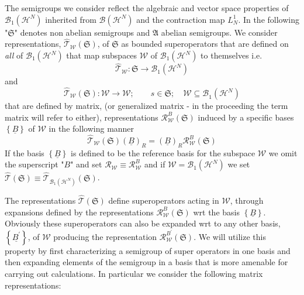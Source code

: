 \documentclass[aps,preprint]{revtex4}%
\begin{document}
The semigroups we consider reflect the algebraic and vector space properties
of $\mathcal{B}_{1}\left(  \mathcal{H}^{N}\right)  $ inherited from
$\mathcal{B}\left(  \mathcal{H}^{N}\right)  $ and the contraction map
$L_{N}^{1}$. In the following "$\mathfrak{S}$" denotes non abelian semigroups
and $\mathfrak{A}$ abelian semigroups. We consider representations,
$\mathcal{\hat{T}}_{\mathcal{W}}\left(  \mathfrak{S}\right)  $, of
$\mathfrak{S}$ as bounded superoperators that are defined on \emph{all }of
$\mathcal{B}_{1}\left(  \mathcal{H}^{N}\right)  $ that map subspaces
$\mathcal{W}$ of $\mathcal{B}_{1}\left(  \mathcal{H}^{N}\right)  $ to
themselves i.e.
\begin{equation}
\mathcal{\hat{T}}_{\mathcal{W}}:\mathfrak{S}\rightarrow\mathcal{B}_{1}\left(
\mathcal{H}^{N}\right)
\end{equation}
and
\begin{equation}
\mathcal{\hat{T}}_{\mathcal{W}}\left(  \mathfrak{S}\right)  :\mathcal{W}%
\rightarrow\mathcal{W};\qquad s\in\mathfrak{S};\quad\mathcal{W\subseteq B}%
_{1}\left(  \mathcal{H}^{N}\right)
\end{equation}
that are defined by matrix, (or generalized matrix - in the proceeding the
term matrix will refer to either), representations $\mathcal{R}_{\mathcal{W}%
}^{B}\left(  \mathfrak{S}\right)  $ induced by a specific bases $\left\{
\underline{B}\right\}  $ of $\mathcal{W}$ in the following manner
\begin{equation}
\mathcal{\hat{T}}_{\mathcal{W}}\left(  \mathfrak{S}\right)  \left(
\underline{B}\right)  _{R}=\left(  \underline{B}\right)  _{R}\mathcal{R}%
_{\mathcal{W}}^{B}\left(  \mathfrak{S}\right)
\end{equation}
If the basis $\left\{  \underline{B}\right\}  $ is defined to be the reference
basis for the subspace $\mathcal{W}$ we omit the superscript "$B$" and set
$\mathcal{R}_{\mathcal{W}}\equiv\mathcal{R}_{\mathcal{W}}^{B}$ and if
$\mathcal{W}=\mathcal{B}_{1}\left(  \mathcal{H}^{N}\right)  $ we set
$\mathcal{\hat{T}}\left(  \mathfrak{S}\right)  \equiv\mathcal{\hat{T}%
}_{\mathcal{B}_{1}\left(  \mathcal{H}^{N}\right)  }\left(  \mathfrak{S}%
\right)  $.

The representations $\mathcal{\hat{T}}\left(  \mathfrak{S}\right)  $ define
superoperators acting in $\mathcal{W}$, through expansions defined by the
representations $\mathcal{R}_{\mathcal{W}}^{B}\left(  \mathfrak{S}\right)  $
wrt the basis $\left\{  \underline{B}\right\}  $. Obviously these
superoperators can also be expanded wrt to any other basis, $\left\{
\underline{B^{\prime}}\right\}  $, of $\mathcal{W}$ producing the
representation $\mathcal{R}_{\mathcal{W}}^{B^{\prime}}\left(  \mathfrak{S}%
\right)  $. We will utilize this property by first characterizing a semigroup
of super operators in one basis and then expanding elements of the semigroup
in a basis that is more amenable for carrying out calculations. In particular
we consider the following matrix representations:
\end{document}
